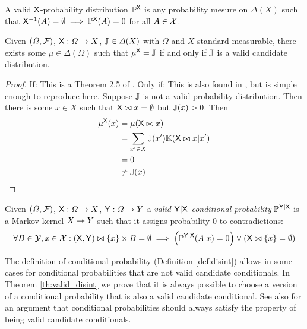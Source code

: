 \begin{definition}\label{def:valid_dist}
A valid $\mathsf{X}$-probability distribution $\mathbb{P}^{\mathsf{X}}$ is any probability mesure on $\Delta(X)$ such that $\mathsf{X}^{-1}(A)=\emptyset\implies \mathbb{P}^{\mathsf{X}}(A) = 0$ for all $A\in\mathcal{X}$.
\end{definition}


\begin{theorem}[Validity]\label{th:completion}
Given $(\Omega,\mathcal{F})$, $\mathsf{X}:\Omega\to X$, $\mathbb{J}\in \Delta(X)$ with $\Omega$ and $X$ standard measurable, there exists some $\mu\in \Delta(\Omega)$ such that $\mu^{\mathsf{X}}=\mathbb{J}$ if and only if $\mathbb{J}$ is a valid candidate distribution.
\end{theorem}

\begin{proof}
If:
This is a Theorem 2.5 of \citet{ershov_extension_1975}.
Only if:
This is also found in \citet{ershov_extension_1975}, but is simple enough to reproduce here. Suppose $\mathbb{J}$ is not a valid probability distribution. Then there is some $x\in X$ such that $\mathsf{X}\bowtie x = \emptyset$ but $\mathbb{J}(x)>0$. Then
\begin{align}
	\mu^{\mathsf{X}}(x) &= \mu (\mathsf{X}\bowtie x)\\
	&= \sum_{x'\in X} \mathbb{J}(x') \mathbb{K}(\mathsf{X}\bowtie x|x')\\
	&= 0\\
	&\neq \mathbb{J}(x)
\end{align}
\end{proof}

\begin{definition}\label{def:valid_conditional_prob}
Given $(\Omega,\mathcal{F})$, $\mathsf{X}:\Omega\to X$, $\mathsf{Y}:\Omega\to Y$ a \emph{valid $\mathsf{Y}|\mathsf{X}$ conditional probability} $\mathbb{P}^{\mathsf{Y}|\mathsf{X}}$ is a Markov kernel $X\rightarrowtriangle Y$ such that it assigns probability 0 to contradictions:
\begin{align}
	\forall B\in \mathcal{Y}, x\in \mathcal{X}: (\mathsf{X},\mathsf{Y})\bowtie \{x\}\times B = \emptyset \implies \left(\mathbb{P}^{\mathsf{Y}|\mathsf{X}}(A|x) = 0\right) \lor \left(\mathsf{X}\bowtie \{x\} = \emptyset\right)
\end{align}
\end{definition}

The definition of conditional probability (Definition \ref{def:disint}) allows in some cases for conditional probabilities that are not valid candidate conditionals. In Theorem \ref{th:valid_disint} we prove that it is always possible to choose a version of a conditional probability that is also a valid candidate conditional. See also \citet{hajek_what_2003} for an argument that conditional probabilities should always satisfy the property of being valid candidate conditionals.

